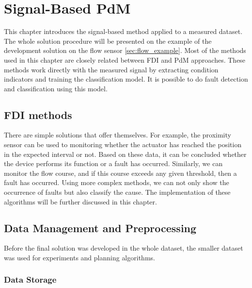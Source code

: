 %




\chapter{Signal-Based PdM}
This chapter introduces the signal-based method applied to a measured
dataset.  The whole solution procedure will be presented on the example of
the development solution on the flow sensor \ref{sec:flow_example}.  Most
of the methods used in this chapter are closely related between FDI and PdM
approaches. These methods work directly with the measured signal by
extracting condition indicators and training the classification model. It
is possible to do fault detection and classification using this model.


\section{FDI methods}\label{sec:easy_fdi}
There are simple solutions that offer themselves. For example, the
proximity sensor can be used to monitoring whether the actuator has reached
the position in the expected interval or not. Based on these data, it can
be concluded whether the device performs its function or a fault has
occurred.  Similarly, we can monitor the flow course, and if this course
exceeds any given threshold, then a fault has occurred.  Using more complex
methods, we can not only show the occurrence of faults but also classify
the cause. The implementation of these algorithms will be further discussed
in this chapter.

\section{Data Management and Preprocessing}
Before the final solution was developed in the whole dataset, the smaller
dataset was used for experiments and planning algorithms. 

\subsection{Data Storage}
